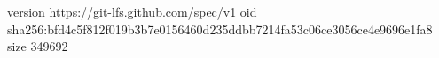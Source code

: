version https://git-lfs.github.com/spec/v1
oid sha256:bfd4c5f812f019b3b7e0156460d235ddbb7214fa53c06ce3056ce4e9696e1fa8
size 349692
